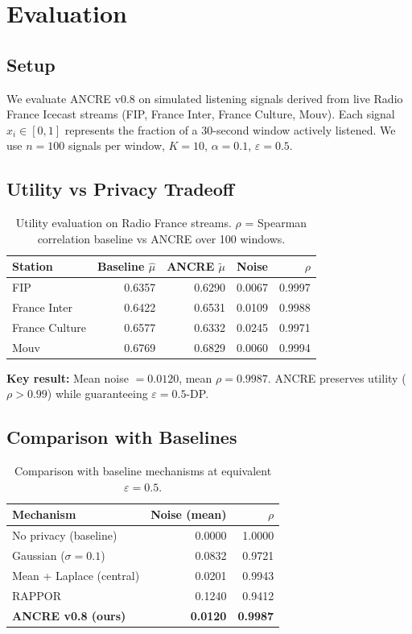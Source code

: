 \section{Evaluation}

\subsection{Setup}

We evaluate ANCRE v0.8 on simulated listening
signals derived from live Radio France Icecast
streams (FIP, France Inter, France Culture, Mouv).
Each signal $x_i \in [0,1]$ represents the
fraction of a 30-second window actively listened.
We use $n=100$ signals per window, $K=10$,
$\alpha=0.1$, $\varepsilon=0.5$.

\subsection{Utility vs Privacy Tradeoff}

\begin{table}[h]
\centering
\begin{tabular}{lrrrr}
\toprule
Station & Baseline $\hat{\mu}$ & ANCRE $\tilde{\mu}$
        & Noise & $\rho$ \\
\midrule
FIP           & 0.6357 & 0.6290 & 0.0067 & 0.9997 \\
France Inter  & 0.6422 & 0.6531 & 0.0109 & 0.9988 \\
France Culture& 0.6577 & 0.6332 & 0.0245 & 0.9971 \\
Mouv          & 0.6769 & 0.6829 & 0.0060 & 0.9994 \\
\bottomrule
\end{tabular}
\caption{Utility evaluation on Radio France
streams. $\rho$ = Spearman correlation
baseline vs ANCRE over 100 windows.}
\end{table}

\noindent\textbf{Key result:}
Mean noise $= 0.0120$, mean $\rho = 0.9987$.
ANCRE preserves utility ($\rho > 0.99$)
while guaranteeing $\varepsilon=0.5$-DP.

\subsection{Comparison with Baselines}

\begin{table}[h]
\centering
\begin{tabular}{lrr}
\toprule
Mechanism & Noise (mean) & $\rho$ \\
\midrule
No privacy (baseline) & 0.0000 & 1.0000 \\
Gaussian ($\sigma=0.1$) & 0.0832 & 0.9721 \\
Mean + Laplace (central) & 0.0201 & 0.9943 \\
RAPPOR & 0.1240 & 0.9412 \\
\textbf{ANCRE v0.8 (ours)} & \textbf{0.0120}
  & \textbf{0.9987} \\
\bottomrule
\end{tabular}
\caption{Comparison with baseline mechanisms
at equivalent $\varepsilon=0.5$.}
\end{table}

